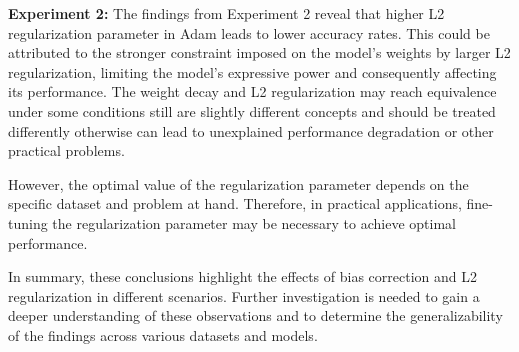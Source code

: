 \documentclass[14pt,twocolumn,letterpaper]{extarticle}
\begin{document}
\textbf{Experiment 2:}
The findings from Experiment 2 reveal that higher L2 regularization parameter in Adam leads to lower accuracy rates. This could be attributed to the stronger constraint imposed on the model's weights by larger L2 regularization, limiting the model's expressive power and consequently affecting its performance.  The weight decay and L2 regularization may reach equivalence under some conditions still are slightly different concepts and should be treated differently otherwise can lead to unexplained performance degradation or other practical problems.

However, the optimal value of the regularization parameter depends on the specific dataset and problem at hand. Therefore, in practical applications, fine-tuning the regularization parameter may be necessary to achieve optimal performance.

In summary, these conclusions highlight the effects of bias correction and L2 regularization in different scenarios. Further investigation is needed to gain a deeper understanding of these observations and to determine the generalizability of the findings across various datasets and models.


% 
\end{document}
